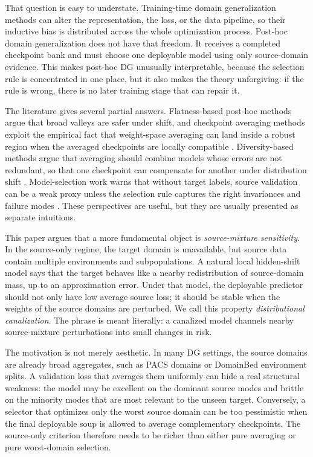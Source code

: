 \documentclass{article}
\theoremstyle{definition}
\begin{document}
That question is easy to understate. Training-time domain generalization methods can alter the representation, the loss, or the data pipeline, so their inductive bias is distributed across the whole optimization process. Post-hoc domain generalization does not have that freedom. It receives a completed checkpoint bank and must choose one deployable model using only source-domain evidence. This makes post-hoc DG unusually interpretable, because the selection rule is concentrated in one place, but it also makes the theory unforgiving: if the rule is wrong, there is no later training stage that can repair it.

The literature gives several partial answers. Flatness-based post-hoc methods argue that broad valleys are safer under shift, and checkpoint averaging methods exploit the empirical fact that weight-space averaging can land inside a robust region when the averaged checkpoints are locally compatible \citep{izmailov2018swa,garipov2018mode,frankle2020linear,cha2021swad,wortsman2022soups}. Diversity-based methods argue that averaging should combine models whose errors are not redundant, so that one checkpoint can compensate for another under distribution shift \citep{rame2022diwa,arpit2022eoa}. Model-selection work warns that without target labels, source validation can be a weak proxy unless the selection rule captures the right invariances and failure modes \citep{gulrajani2021domainbed}. These perspectives are useful, but they are usually presented as separate intuitions.

This paper argues that a more fundamental object is \emph{source-mixture sensitivity}. In the source-only regime, the target domain is unavailable, but source data contain multiple environments and subpopulations. A natural local hidden-shift model says that the target behaves like a nearby redistribution of source-domain mass, up to an approximation error. Under that model, the deployable predictor should not only have low average source loss; it should be stable when the weights of the source domains are perturbed. We call this property \emph{distributional canalization}. The phrase is meant literally: a canalized model channels nearby source-mixture perturbations into small changes in risk.

The motivation is not merely aesthetic. In many DG settings, the source domains are already broad aggregates, such as PACS domains or DomainBed environment splits. A validation loss that averages them uniformly can hide a real structural weakness: the model may be excellent on the dominant source modes and brittle on the minority modes that are most relevant to the unseen target. Conversely, a selector that optimizes only the worst source domain can be too pessimistic when the final deployable soup is allowed to average complementary checkpoints. The source-only criterion therefore needs to be richer than either pure averaging or pure worst-domain selection.
\end{document}
